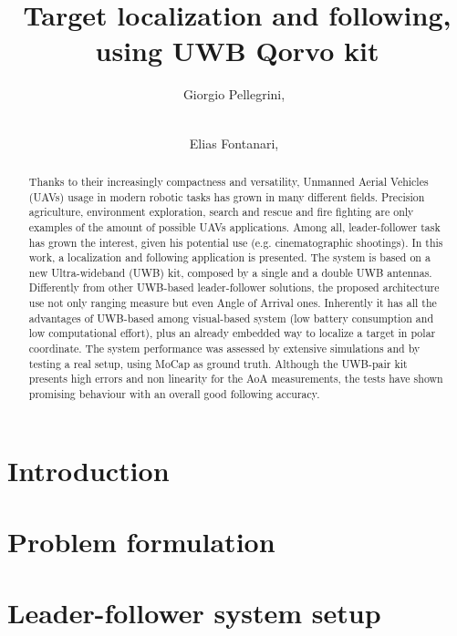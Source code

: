 \documentclass[journal,9pt,a4paper]{IEEEtran}
\begin{document}
\title{Target localization and following, using UWB Qorvo kit}

\author{Giorgio Pellegrini,~
\and
\\ Elias Fontanari,~
        }
\maketitle
\thispagestyle{plain}
\pagestyle{plain}
\IEEEpeerreviewmaketitle



\begin{abstract}
Thanks to their increasingly compactness and versatility, Unmanned Aerial Vehicles (UAVs) usage in modern robotic tasks has grown in many different fields. Precision agriculture, environment exploration, search and rescue and fire fighting are only examples of the amount of possible UAVs applications. Among all, leader-follower task has grown the interest, given his potential use (e.g. cinematographic shootings). In this work, a localization and following application is presented. The system is based on a new Ultra-wideband (UWB) kit, composed by a single and a double UWB antennas. Differently from other UWB-based leader-follower solutions, the proposed architecture use not only ranging measure but even Angle of Arrival ones. Inherently it has all the advantages of UWB-based among visual-based system (low battery consumption and low computational effort), plus an already embedded way to localize a target in polar coordinate. The system performance was assessed by extensive simulations and by testing a real setup, using MoCap as ground truth. Although the UWB-pair kit presents high errors and non linearity for the AoA measurements, the tests have shown promising behaviour with an overall good following accuracy.
\end{abstract}

\section{Introduction}\label{INTRO}


\section{Problem formulation}\label{PRB_FORM}


\section{Leader-follower system setup}\label{ARCHIT}

\end{document}
